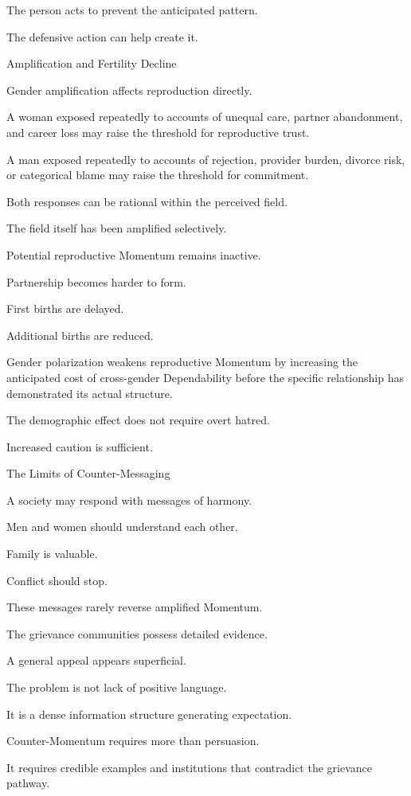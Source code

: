 The person acts to prevent the anticipated pattern.

The defensive action can help create it.

Amplification and Fertility Decline

Gender amplification affects reproduction directly.

A woman exposed repeatedly to accounts of unequal care, partner abandonment, and career loss may raise the threshold for reproductive trust.

A man exposed repeatedly to accounts of rejection, provider burden, divorce risk, or categorical blame may raise the threshold for commitment.

Both responses can be rational within the perceived field.

The field itself has been amplified selectively.

Potential reproductive Momentum remains inactive.

Partnership becomes harder to form.

First births are delayed.

Additional births are reduced.

Gender polarization weakens reproductive Momentum by increasing the anticipated cost of cross-gender Dependability before the specific relationship has demonstrated its actual structure.

The demographic effect does not require overt hatred.

Increased caution is sufficient.

The Limits of Counter-Messaging

A society may respond with messages of harmony.

Men and women should understand each other.

Family is valuable.

Conflict should stop.

These messages rarely reverse amplified Momentum.

The grievance communities possess detailed evidence.

A general appeal appears superficial.

The problem is not lack of positive language.

It is a dense information structure generating expectation.

Counter-Momentum requires more than persuasion.

It requires credible examples and institutions that contradict the grievance pathway.

